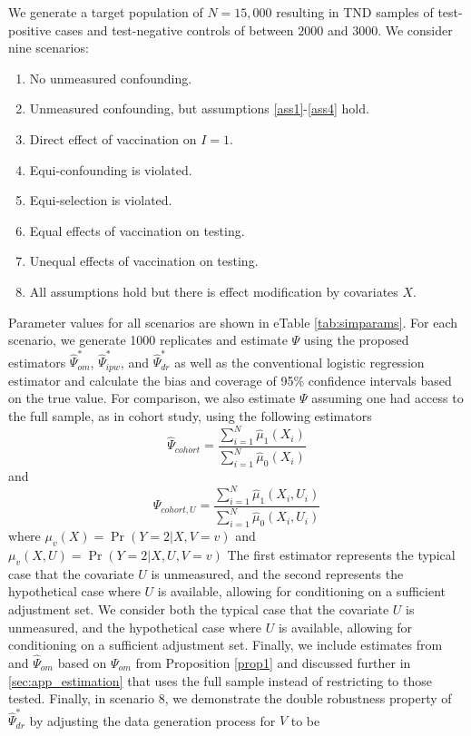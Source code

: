 \begin{appendix}
\begin{refsection}
 We generate a target population of $N = 15,000$ resulting in TND samples of test-positive cases and test-negative controls of between $2000$ and $3000$. We consider nine scenarios: 
 \begin{enumerate}
    \item No unmeasured confounding.
    \item Unmeasured confounding, but assumptions \ref{ass1}-\ref{ass4} hold.
    \item Direct effect of vaccination on $I=1$.
    \item Equi-confounding is violated.
    \item Equi-selection is violated.
    \item Equal effects of vaccination on testing.
    \item Unequal effects of vaccination on testing.
    \item All assumptions hold but there is effect modification by covariates $X$.
 \end{enumerate}
 Parameter values for all scenarios are shown in eTable \ref{tab:simparams}. For each scenario, we generate 1000 replicates and estimate $\Psi$ using the proposed estimators $\widehat{\Psi}_{om}^*$, $\widehat{\Psi}_{ipw}^*$, and $\widehat{\Psi}_{dr}^*$ as well as the conventional logistic regression estimator and calculate the bias and coverage of 95\% confidence intervals based on the true value. For comparison, we also estimate $\Psi$  assuming one had access to the full sample, as in cohort study, using the following estimators
 \begin{equation}\label{eqn:cohort_estimator}
    \widehat{\Psi}_{cohort} = \dfrac{\sum_{i=1}^N\widehat{\mu}_1(X_i)}{\sum_{i=1}^N\widehat{\mu}_0(X_i)}
 \end{equation}
 and 
 \begin{equation}\label{eqn:cohort_u_estimator}
    \widehat{\Psi}_{cohort,U} = \dfrac{\sum_{i=1}^N\widehat{\mu}_1(X_i, U_i)}{\sum_{i=1}^N\widehat{\mu}_0(X_i, U_i)}
 \end{equation}
 where $\mu_v(X) = \Pr(Y=2 | X, V=v)$ and $\mu_v(X,U) = \Pr(Y=2 | X, U, V=v)$
 The first estimator represents the typical case that the covariate $U$ is unmeasured, and the second represents the hypothetical case where $U$ is available, allowing for conditioning on a sufficient adjustment set. We consider both the typical case that the covariate $U$ is unmeasured, and the hypothetical case where $U$ is available, allowing for conditioning on a sufficient adjustment set. Finally, we include estimates from and $\widehat{\Psi}_{om}$ based on $\Psi_{om}$ from Proposition \ref{prop1} and discussed further in \ref{sec:app_estimation} that uses the full sample instead of restricting to those tested. Finally, in scenario 8, we demonstrate the double robustness property of $\widehat{\Psi}_{dr}^*$ by adjusting the data generation process for $V$ to be

\end{refsection}
\end{appendix}

